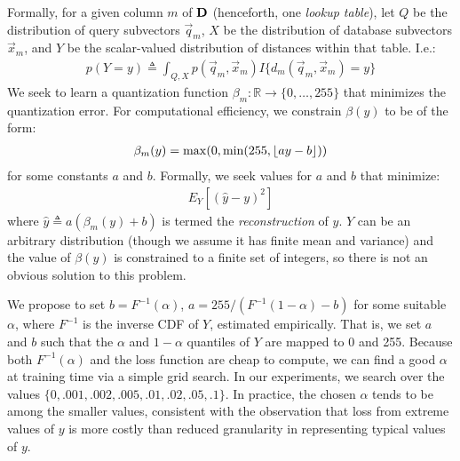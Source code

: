 Formally, for a given column $m$ of $\mat{D}$ (henceforth, one \textit{lookup table}), let $Q$ be the distribution of query subvectors $\vec{q}_m$, $X$ be the distribution of database subvectors $\vec{x}_m$, and $Y$ be the scalar-valued distribution of distances within that table. I.e.:
\begin{align}
    p(Y = y) \triangleq \int_{Q, X} p(\vec{q}_m, \vec{x}_m)I\{d_m(\vec{q}_m, \vec{x}_m) = y\}
\end{align}
We seek to learn a quantization function $\beta_m: \mathbb{R} \rightarrow \{0,\ldots,255\} $ that minimizes the quantization error. For computational efficiency, we constrain $\beta(y)$ to be of the form:
\begin{align}
    \beta_m(y) = \max(0, \min(255, \floor*{ay - b}))
\end{align}
for some constants $a$ and $b$. Formally, we seek values for $a$ and $b$ that minimize:
\begin{align}
    E_Y[(\hat{y} - y)^2]
\end{align}
where $\hat{y} \triangleq a(\beta_m(y) + b)$ is termed the \textit{reconstruction} of $y$.
$Y$ can be an arbitrary distribution (though we assume it has finite mean and variance) and the value of $\beta(y)$ is constrained to a finite set of integers, so there is not an obvious solution to this problem.

We propose to set $b = F^{-1}(\alpha)$, $a = 255 / (F^{-1}(1 - \alpha) - b)$ for some suitable $\alpha$, where $F^{-1}$ is the inverse CDF of $Y$, estimated empirically. That is, we set $a$ and $b$ such that the $\alpha$ and $1 - \alpha$ quantiles of $Y$ are mapped to 0 and 255. Because both $F^{-1}(\alpha)$ and the loss function are cheap to compute, we can find a good $\alpha$ at training time via a simple grid search. In our experiments, we search over the values $\{0, .001, .002, .005, .01, .02, .05, .1\}$. In practice, the chosen $\alpha$ tends to be among the smaller values, consistent with the observation that loss from extreme values of $y$ is more costly than reduced granularity in representing typical values of $y$.

